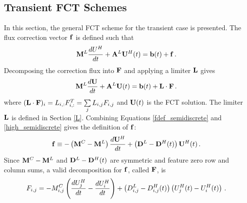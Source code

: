 \subsection{Transient FCT Schemes}
In this section, the general FCT scheme for the transient case is presented.
The flux correction vector $\mathbf{f}$ is defined such that
\begin{equation}\label{fdef_semidiscrete}
   \mathbf{M}^L\frac{dU^{H}}{dt} + \mathbf{A}^L\mathbf{U}^H(t) = \mathbf{b}(t) + \mathbf{f} \,.
\end{equation}
Decomposing the correction flux into $\mathbf{F}$ and applying a limiter $\mathbf{L}$ gives
\begin{equation}\label{limited_semidiscrete}
   \mathbf{M}^L\frac{d\mathbf{U}}{dt} + \mathbf{A}^L\mathbf{U}(t) = \mathbf{b}(t) + \mathbf{L}\cdot\mathbf{F} \,.
\end{equation}
where $(\mathbf{L}\cdot\mathbf{F})_i = L_{i,:}F_{i,:}^T = \sum\limits_j L_{i,j} F_{i,j}$
and $\mathbf{U}(t)$ is the FCT solution. The limiter $\mathbf{L}$ is
defined in Section \ref{L}.
Combining Equations \eqref{fdef_semidiscrete} and \eqref{high_semidiscrete}
gives the definition of $\mathbf{f}$:
\begin{equation}\label{f_semidiscrete}
   \mathbf{f} \equiv -\left(\mathbf{M}^C-\mathbf{M}^L\right)\frac{d\mathbf{U}^H}{dt} + \left(\mathbf{D}^L-\mathbf{D}^H(t)\right)\mathbf{U}^H(t) \,.
\end{equation}
Since $\mathbf{M}^C-\mathbf{M}^L$ and $\mathbf{D}^L-\mathbf{D}^H(t)$ are symmetric
and feature zero row and column sums, a valid decomposition for $\mathbf{f}$,
called $\mathbf{F}$, is
\begin{equation}
   F_{i,j} = -M^C_{i,j}\left(\frac{dU_j^H}{dt} - \frac{dU_i^H}{dt}\right)
   + \left(D_{i,j}^L-D_{i,j}^H(t)\right)\left(U_j^H(t) - U_i^H(t)\right) \,.
\end{equation}
